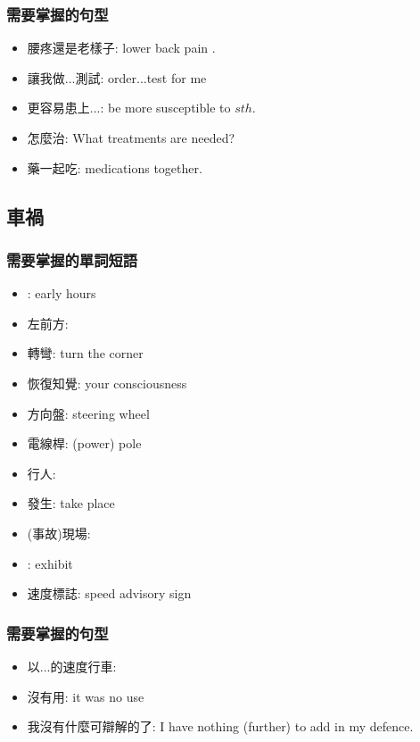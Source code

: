 \subsubsection*{需要掌握的句型}
\begin{multicols}{2}
\begin{itemize}
  \itemsep0em
  \item 腰疼還是老樣子: lower back pain .
  \item 讓我做...測試: order...test for me
  \item 更容易患上...: be more susceptible to $sth.$
  \item 怎麼治: What treatments are needed?
  \item 藥一起吃: medications  together.
\end{itemize}
\end{multicols}

\subsection{車禍}
\subsubsection*{需要掌握的單詞短語}
\begin{multicols}{2}
\begin{itemize}
  \itemsep0em
  \item {}: early hours
  \item 左前方: 
  \item 轉彎: turn the corner
  \item 恢復知覺:  your consciousness
  \item 方向盤: steering wheel
  \item 電線桿: (power) pole
  \item 行人: 
  \item 發生: take place
  \item (事故)現場: 
  \item {}: exhibit
  \item 速度標誌: speed advisory sign
\end{itemize}
\end{multicols}

\subsubsection*{需要掌握的句型}
\begin{multicols}{2}
\begin{itemize}
  \itemsep0em
  \item 以...的速度行車: 
  \item 沒有用: it was no use
  \item 我沒有什麼可辯解的了: I have nothing (further) to add in my defence.
\end{itemize}
\end{multicols}

